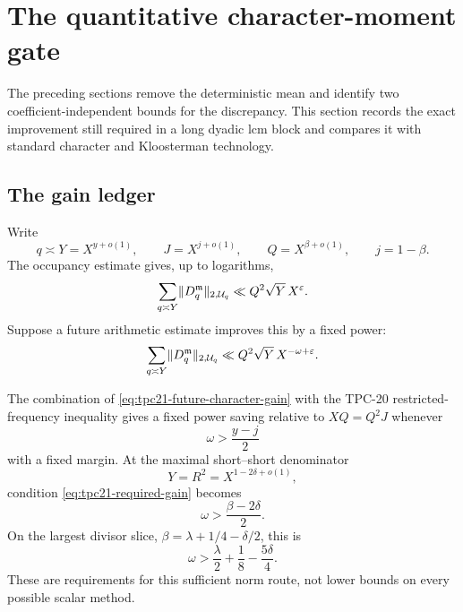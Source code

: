 \section{The quantitative character-moment gate}
\label{sec:tpc21-technology}

The preceding sections remove the deterministic mean and identify two
coefficient-independent bounds for the discrepancy.  This section
records the exact improvement still required in a long dyadic lcm block
and compares it with standard character and Kloosterman technology.

\subsection{The gain ledger}

Write
\begin{equation}
 q\asymp Y=X^{y+o(1)},\qquad
 J=X^{j+o(1)},\qquad
 Q=X^{\beta+o(1)},\qquad j=1-\beta.
 \label{eq:tpc21-exponent-notation}
\end{equation}
The occupancy estimate gives, up to logarithms,
\begin{equation}
 \sum_{q\asymp Y}
 \lVert D_q^{\mathfrak m}\rVert_{2,\mathcal U_q}
 \ll Q^2\sqrt Y\,X^\varepsilon.
 \label{eq:tpc21-occupancy-block-norm}
\end{equation}
Suppose a future arithmetic estimate improves this by a fixed power:
\begin{equation}
 \sum_{q\asymp Y}
 \lVert D_q^{\mathfrak m}\rVert_{2,\mathcal U_q}
 \ll Q^2\sqrt Y\,X^{-\omega+\varepsilon}.
 \label{eq:tpc21-future-character-gain}
\end{equation}

\begin{proposition}
\label{prop:tpc21-required-gain}
The combination of \eqref{eq:tpc21-future-character-gain} with the
TPC-20 restricted-frequency inequality gives a fixed power saving
relative to \(XQ=Q^2J\) whenever
\begin{equation}
 \boxed{\qquad
 \omega>\frac{y-j}{2}
 \qquad}
 \label{eq:tpc21-required-gain}
\end{equation}
with a fixed margin.  At the maximal short--short denominator
\begin{equation}
 Y=R^2=X^{1-2\delta+o(1)},
 \label{eq:tpc21-maximal-Y}
\end{equation}
condition \eqref{eq:tpc21-required-gain} becomes
\begin{equation}
 \omega>\frac{\beta-2\delta}{2}.
 \label{eq:tpc21-top-required-gain}
\end{equation}
On the largest divisor slice,
\(\beta=\lambda+1/4-\delta/2\), this is
\begin{equation}
 \boxed{\qquad
 \omega>\frac{\lambda}{2}+\frac18-\frac{5\delta}{4}.
 \qquad}
 \label{eq:tpc21-profile-required-gain}
\end{equation}
These are requirements for this sufficient norm route, not lower bounds
on every possible scalar method.
\end{proposition}

